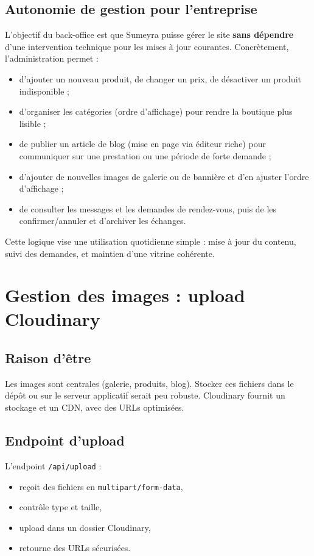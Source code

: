 \subsection{Autonomie de gestion pour l’entreprise}
L’objectif du back-office est que Sumeyra puisse gérer le site \textbf{sans dépendre} d’une intervention technique pour les mises à jour courantes. Concrètement, l’administration permet :
\begin{itemize}
    \item d’ajouter un nouveau produit, de changer un prix, de désactiver un produit indisponible ;
    \item d’organiser les catégories (ordre d’affichage) pour rendre la boutique plus lisible ;
    \item de publier un article de blog (mise en page via éditeur riche) pour communiquer sur une prestation ou une période de forte demande ;
    \item d’ajouter de nouvelles images de galerie ou de bannière et d’en ajuster l’ordre d’affichage ;
    \item de consulter les messages et les demandes de rendez-vous, puis de les confirmer/annuler et d’archiver les échanges.
\end{itemize}
Cette logique vise une utilisation quotidienne simple : mise à jour du contenu, suivi des demandes, et maintien d’une vitrine cohérente.

\section{Gestion des images : upload Cloudinary}

\subsection{Raison d’être}
Les images sont centrales (galerie, produits, blog). Stocker ces fichiers dans le dépôt ou sur le serveur applicatif serait peu robuste. Cloudinary fournit un stockage et un CDN, avec des URLs optimisées.

\subsection{Endpoint d’upload}
L’endpoint \texttt{/api/upload} :
\begin{itemize}
    \item reçoit des fichiers en \texttt{multipart/form-data},
    \item contrôle type et taille,
    \item upload dans un dossier Cloudinary,
    \item retourne des URLs sécurisées.
\end{itemize}

